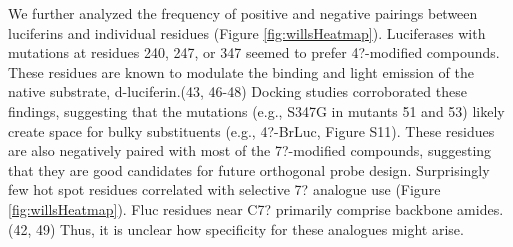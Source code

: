 We further analyzed the frequency of positive and negative pairings between luciferins and individual residues (Figure \ref{fig:willsHeatmap}). Luciferases with mutations at residues 240, 247, or 347 seemed to prefer 4?-modified compounds. These residues are known to modulate the binding and light emission of the native substrate, d-luciferin.\cite{Harwood:2011gl,Branchini:2003kt,Branchini:2007bw,Viviani:2013cj}(43, 46-48) Docking studies corroborated these findings, suggesting that the mutations (e.g., S347G in mutants 51 and 53) likely create space for bulky substituents (e.g., 4?-BrLuc, Figure S11). These residues are also negatively paired with most of the 7?-modified compounds, suggesting that they are good candidates for future orthogonal probe design. Surprisingly few hot spot residues correlated with selective 7? analogue use (Figure \ref{fig:willsHeatmap}). Fluc residues near C7? primarily comprise backbone amides.\cite{Sundlov:2012kn,Viviani:2013ej}(42, 49) Thus, it is unclear how specificity for these analogues might arise.

